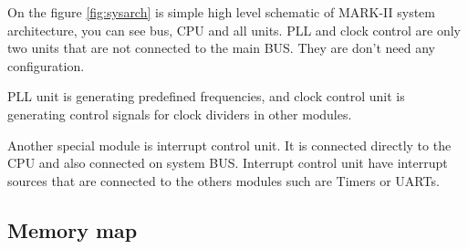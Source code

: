 On the figure \ref{fig:sysarch} is simple high level schematic of MARK-II system architecture,
you can see bus, CPU and all units. PLL and clock control are only two units
that are not connected to the main BUS. They are don't need any configuration.

PLL unit is generating predefined frequencies, and clock control unit is
generating control signals for clock dividers in other modules.

Another special module is interrupt control unit. It is connected directly to
the CPU and also connected on system BUS. Interrupt control unit have interrupt
sources that are connected to the others modules such are Timers or UARTs.

\subsection{Memory map}

